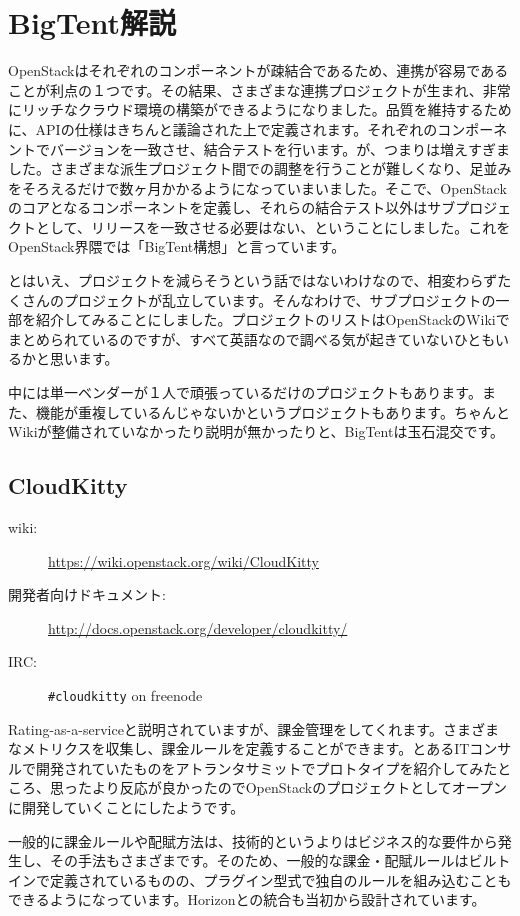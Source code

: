 \chapter{BigTent解説}
OpenStackはそれぞれのコンポーネントが疎結合であるため、連携が容易であることが利点の１つです。その結果、さまざまな連携プロジェクトが生まれ、非常にリッチなクラウド環境の構築ができるようになりました。品質を維持するために、APIの仕様はきちんと議論された上で定義されます。それぞれのコンポーネントでバージョンを一致させ、結合テストを行います。が、つまりは増えすぎました。さまざまな派生プロジェクト間での調整を行うことが難しくなり、足並みをそろえるだけで数ヶ月かかるようになっていまいました。そこで、OpenStackのコアとなるコンポーネントを定義し、それらの結合テスト以外はサブプロジェクトとして、リリースを一致させる必要はない、ということにしました。これをOpenStack界隈では「BigTent構想」と言っています。

とはいえ、プロジェクトを減らそうという話ではないわけなので、相変わらずたくさんのプロジェクトが乱立しています。そんなわけで、サブプロジェクトの一部を紹介してみることにしました。プロジェクトのリストはOpenStackのWikiでまとめられているのですが、すべて英語なので調べる気が起きていないひともいるかと思います。

中には単一ベンダーが１人で頑張っているだけのプロジェクトもあります。また、機能が重複しているんじゃないかというプロジェクトもあります。ちゃんとWikiが整備されていなかったり説明が無かったりと、BigTentは玉石混交です。

\section{CloudKitty}
\begin{description}
	\item[wiki:] \url{https://wiki.openstack.org/wiki/CloudKitty}
	\item[開発者向けドキュメント:] \url{http://docs.openstack.org/developer/cloudkitty/}
	\item[IRC:] \verb|#cloudkitty| on freenode
\end{description}
Rating-as-a-serviceと説明されていますが、課金管理をしてくれます。さまざまなメトリクスを収集し、課金ルールを定義することができます。とあるITコンサルで開発されていたものをアトランタサミットでプロトタイプを紹介してみたところ、思ったより反応が良かったのでOpenStackのプロジェクトとしてオープンに開発していくことにしたようです。

一般的に課金ルールや配賦方法は、技術的というよりはビジネス的な要件から発生し、その手法もさまざまです。そのため、一般的な課金・配賦ルールはビルトインで定義されているものの、プラグイン型式で独自のルールを組み込むこともできるようになっています。Horizonとの統合も当初から設計されています。

